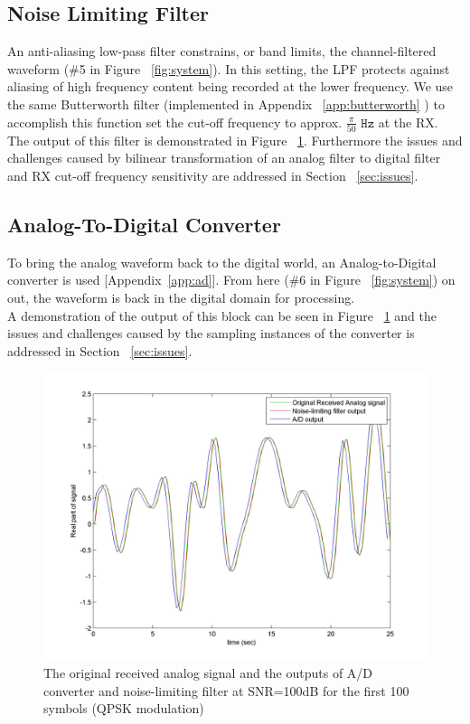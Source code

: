 \documentclass[]{article}
\begin{document}
\subsection{Noise Limiting Filter}
\label{sec:noiseLPF}
An anti-aliasing low-pass filter constrains, or band limits, the channel-filtered waveform (\#5 in Figure ~\ref{fig:system}).  In this setting, the LPF protects against aliasing of high frequency content being recorded at the lower frequency.  We use the same Butterworth filter (implemented in Appendix ~\ref{app:butterworth} ) to accomplish this function set the cut-off frequency to approx. $\frac{\pi}{50}$ $\mathtt{Hz}$ at the RX. The output of this filter is demonstrated in Figure ~\ref{fig:atod}. Furthermore the issues and challenges caused by bilinear transformation of an analog filter to digital filter and RX cut-off frequency sensitivity are addressed in Section ~\ref{sec:issues}.

\subsection{Analog-To-Digital Converter}
\label{sec:adc}
To bring the analog waveform back to the digital world, an Analog-to-Digital converter is used [Appendix~\ref{app:ad}].  From here (\#6 in Figure ~\ref{fig:system}) on out, the waveform is back in the digital domain for processing. \\

A demonstration of the output of this block can be seen in Figure ~\ref{fig:atod} and the issues and challenges caused by the sampling instances of the converter is addressed in Section ~\ref{sec:issues}.

	\begin{figure}[H]
	\centering
	\includegraphics[width=\textwidth]	{AtoD.jpg}
	\caption{The original received analog signal and the outputs of A/D converter and noise-limiting filter at SNR=100dB for the first 100 symbols (QPSK modulation)\label{fig:atod}}
	\end{figure}
\end{document}
